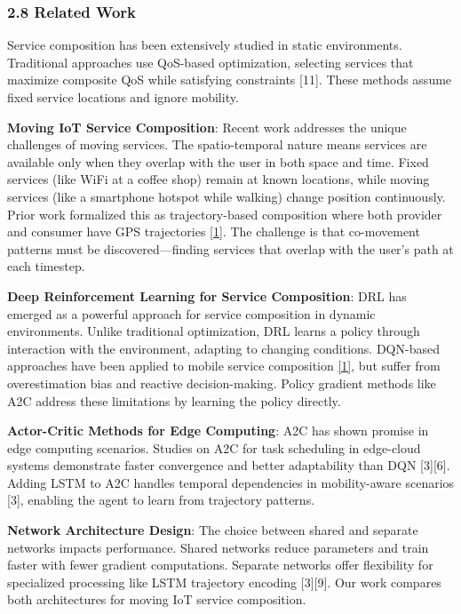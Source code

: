 \hypertarget{related-work}{%
	\subsubsection{2.8 Related Work}\label{related-work}}

Service composition has been extensively studied in static environments.
Traditional approaches use QoS-based optimization, selecting services
that maximize composite QoS while satisfying constraints {[}11{]}. These
methods assume fixed service locations and ignore mobility.

\textbf{Moving IoT Service Composition}: Recent work addresses the
unique challenges of moving services. The spatio-temporal nature means
services are available only when they overlap with the user in both
space and time. Fixed services (like WiFi at a coffee shop) remain at
known locations, while moving services (like a smartphone hotspot while
walking) change position continuously. Prior work formalized this as
trajectory-based composition where both provider and consumer have GPS
trajectories \hyperlink{cite.neiat2021}{\hyperlink{cite.neiat2021}{[1]}}. The challenge is that co-movement patterns must be
discovered---finding services that overlap with the user's path at each
timestep.

\textbf{Deep Reinforcement Learning for Service Composition}: DRL has
emerged as a powerful approach for service composition in dynamic
environments. Unlike traditional optimization, DRL learns a policy
through interaction with the environment, adapting to changing
conditions. DQN-based approaches have been applied to mobile service
composition \hyperlink{cite.neiat2021}{\hyperlink{cite.neiat2021}{[1]}}, but suffer from overestimation bias and reactive
decision-making. Policy gradient methods like A2C address these
limitations by learning the policy directly.

\textbf{Actor-Critic Methods for Edge Computing}: A2C has shown promise
in edge computing scenarios. Studies on A2C for task scheduling in
edge-cloud systems demonstrate faster convergence and better
adaptability than DQN {[}3{]}{[}6{]}. Adding LSTM to A2C handles
temporal dependencies in mobility-aware scenarios {[}3{]}, enabling the
agent to learn from trajectory patterns.

\textbf{Network Architecture Design}: The choice between shared and
separate networks impacts performance. Shared networks reduce parameters
and train faster with fewer gradient computations. Separate networks
offer flexibility for specialized processing like LSTM trajectory
encoding {[}3{]}{[}9{]}. Our work compares both architectures for moving
IoT service composition.

